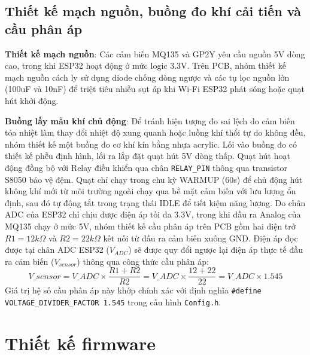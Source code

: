 \subsection{Thiết kế mạch nguồn, buồng đo khí cải tiến và cầu phân áp}
\textbf{Thiết kế mạch nguồn}: Các cảm biến MQ135 và GP2Y yêu cầu nguồn 5V dòng cao, trong khi ESP32 hoạt động ở mức logic 3.3V. Trên PCB, nhóm thiết kế mạch nguồn cách ly sử dụng diode chống dòng ngược và các tụ lọc nguồn lớn (100uF và 10nF) để triệt tiêu nhiễu sụt áp khi Wi-Fi ESP32 phát sóng hoặc quạt hút khởi động.

\textbf{Buồng lấy mẫu khí chủ động}: Để tránh hiện tượng đo sai lệch do cảm biến tỏa nhiệt làm thay đổi nhiệt độ xung quanh hoặc luồng khí thổi tự do không đều, nhóm thiết kế một buồng đo cơ khí kín bằng nhựa acrylic. Lối vào buồng đo có thiết kế phễu định hình, lối ra lắp đặt quạt hút 5V dòng thấp. Quạt hút hoạt động đồng bộ với Relay điều khiển qua chân \texttt{RELAY\_PIN} thông qua transistor S8050 bảo vệ đệm. Quạt chỉ chạy trong chu kỳ WARMUP (60s) để chủ động hút không khí mới từ môi trường ngoài chạy qua bề mặt cảm biến với lưu lượng ổn định, sau đó tự động tắt trong trạng thái IDLE để tiết kiệm năng lượng.
  Do chân ADC của ESP32 chỉ chịu được điện áp tối đa 3.3V, trong khi đầu ra Analog của MQ135 chạy ở mức 5V, nhóm thiết kế cầu phân áp trên PCB gồm hai điện trở $R1 = 12k\Omega$ và $R2 = 22k\Omega$ kết nối từ đầu ra cảm biến xuống GND. Điện áp đọc được tại chân ADC ESP32 ($V_{ADC}$) sẽ được quy đổi ngược lại điện áp thực tế đầu ra cảm biến ($V_{sensor}$) thông qua công thức cầu phân áp:
  \begin{equation}
      V\_{sensor} = V\_{ADC} \times \frac{R1 + R2}{R2} = V\_{ADC} \times \frac{12 + 22}{22} = V\_{ADC} \times 1.545
  \end{equation}
  Giá trị hệ số cầu phân áp này khớp chính xác với định nghĩa \texttt{\#define VOLTAGE\_DIVIDER\_FACTOR 1.545} trong cấu hình \texttt{Config.h}.

\section{Thiết kế firmware}
